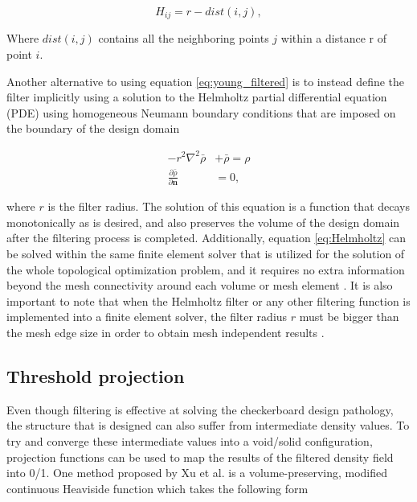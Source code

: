 \documentclass[../main.tex]{subfiles}
\begin{document}
\begin{equation}
  H_{ij} = r -  dist(i, j),
\end{equation}

Where $dist(i,j)$ contains all the neighboring points $j$ within a distance r of point $i$.

Another alternative to using equation \ref{eq:young_filtered} is to instead define the filter implicitly using a solution to the Helmholtz partial differential equation (PDE) using homogeneous Neumann boundary conditions that are imposed on the boundary of the design domain \cite{lazarovFiltersTopologyOptimization2011}

\begin{align}
  -r^2 \nabla ^2 \bar{\rho} &+ \bar{\rho} = \rho \label{eq:Helmholtz}\\ 
 \frac{\partial{\bar{\rho}}}{\partial {\bm{n}}} &= 0 \nonumber,
\end{align}

where $r$ is the filter radius. The solution of this equation is a function that decays monotonically as is desired, and also preserves the volume of the design domain after the filtering process is completed. Additionally, equation \ref{eq:Helmholtz} can be solved within the same finite element solver that is utilized for the solution of the whole topological optimization problem, and it requires no extra information beyond the mesh connectivity around each volume or mesh element \cite{lambeTopologyOptimizationUsing2018}. It is also important to note that when the Helmholtz filter or any other filtering function is implemented into a finite element solver, the filter radius $r$ must be bigger than the mesh edge size in order to obtain mesh independent results \cite{PerformingTopologyOptimization}.

\subsection{Threshold projection}\label{ch:threshold}

Even though filtering is effective at solving the checkerboard design pathology, the structure that is designed can also suffer from intermediate density values. To try and converge these intermediate values into a void/solid configuration, projection functions can be used to map the results of the filtered density field into 0/1. One method proposed by Xu et al. \cite{xuVolumePreservingNonlinear2010} is a volume-preserving, modified continuous Heaviside function which takes the following form
\end{document}
